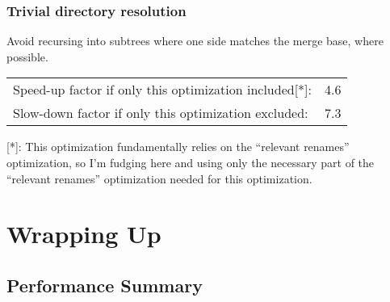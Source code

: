 \documentclass[compress,t]{beamer}
\begin{document}

\begin{frame}
  \frametitle{Trivial directory resolution}

  Avoid recursing into subtrees where one side matches the merge base,
  where possible.

  \pause
  \vspace*{\baselineskip}
  \begin{tabular}{lr}
    Speed-up factor if only this optimization included[*]:  & 4.6 \\
    Slow-down factor if only this optimization excluded: & 7.3
  \end{tabular}

  \vspace*{\baselineskip}
  {\scriptsize
  [*]: This optimization fundamentally relies on the ``relevant
  renames'' optimization, so I'm fudging here and using only the
  necessary part of the ``relevant renames'' optimization needed for
  this optimization.
  }

\end{frame}

\section{Wrapping Up}
\subsection{Performance Summary}
\end{document}
